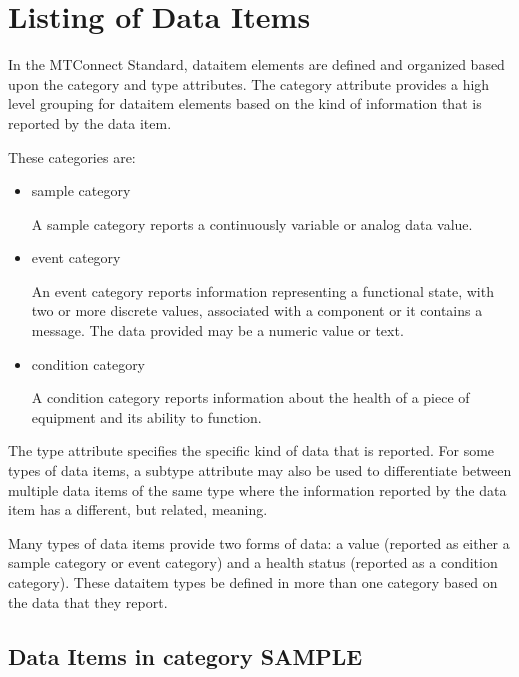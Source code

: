\documentclass{mtconnect}	%
\begin{document}
\section{Listing of Data Items}
\label{sec:Listing of Data Items}

In the MTConnect Standard, \gls{dataitem} elements are defined and organized based upon the \gls{category} and \gls{type} attributes.  
The \gls{category} attribute provides a high level grouping for \gls{dataitem} elements based on the kind of information that is reported by the data item.

These categories are:

\begin{itemize}

\item \gls{sample category}

A \gls{sample category} reports a continuously variable or analog data value. 

\item \gls{event category}

An \gls{event category} reports information representing a functional state, with two or more discrete values, associated with a component or it contains a message.  The data provided may be a numeric value or text.

\item \gls{condition category}

A \gls{condition category} reports information about the health of a piece of equipment and its ability to function.
\end{itemize}

The \gls{type} attribute specifies the specific kind of data that is reported.   For some types of data items, a \gls{subtype} attribute may also be used to differentiate between multiple data items of the same \gls{type} where the information reported by the data item has a different, but related, meaning.

Many types of data items provide two forms of data: a value (reported as either a \gls{sample category} or \gls{event category}) and a health status (reported as a \gls{condition category}).  These \gls{dataitem} types \may be defined in more than one \gls{category} based on the data that they report.

\subsection{Data Items in category SAMPLE}
\end{document}
